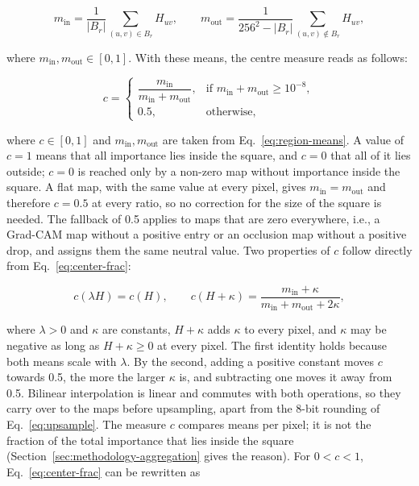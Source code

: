\begin{equation}
m_{\mathrm{in}} = \frac{1}{|B_r|} \sum_{(u,v) \in B_r} H_{uv}, \qquad
m_{\mathrm{out}} = \frac{1}{256^2 - |B_r|} \sum_{(u,v) \notin B_r} H_{uv},
\label{eq:region-means}
\end{equation}

where $m_{\mathrm{in}}, m_{\mathrm{out}} \in [0,1]$. With these means, the centre
measure reads as follows:

\begin{equation}
c =
\begin{cases}
\dfrac{m_{\mathrm{in}}}{m_{\mathrm{in}} + m_{\mathrm{out}}},
& \text{if } m_{\mathrm{in}} + m_{\mathrm{out}} \ge 10^{-8},\\[1.5ex]
0.5, & \text{otherwise,}
\end{cases}
\label{eq:center-frac}
\end{equation}

where $c \in [0,1]$ and $m_{\mathrm{in}}, m_{\mathrm{out}}$ are taken from
Eq.~\eqref{eq:region-means}. A value of $c = 1$ means that all importance lies inside
the square, and $c = 0$ that all of it lies outside; $c = 0$ is reached only by a
non-zero map without importance inside the square. A flat map, with the same value at
every pixel, gives $m_{\mathrm{in}} = m_{\mathrm{out}}$ and therefore $c = 0.5$ at
every ratio, so no correction for the size of the square is needed. The fallback of
0.5 applies to maps that are zero everywhere, i.e., a Grad-CAM map without a positive
entry or an occlusion map without a positive drop, and assigns them the same neutral
value. Two properties of $c$ follow directly from Eq.~\eqref{eq:center-frac}:

\begin{equation}
c(\lambda H) = c(H), \qquad
c(H + \kappa) = \frac{m_{\mathrm{in}} + \kappa}{m_{\mathrm{in}} + m_{\mathrm{out}} +
2\kappa},
\label{eq:c-invariance}
\end{equation}

where $\lambda > 0$ and $\kappa$ are constants, $H + \kappa$ adds $\kappa$ to every
pixel, and $\kappa$ may be negative as long as $H + \kappa \ge 0$ at every pixel. The
first identity holds because both means scale with $\lambda$. By the second, adding a
positive constant moves $c$ towards 0.5, the more the larger $\kappa$ is, and
subtracting one moves it away from 0.5.
Bilinear interpolation is linear and commutes with both operations, so they carry over
to the maps before upsampling, apart from the 8-bit rounding of
Eq.~\eqref{eq:upsample}. The measure $c$ compares means per pixel; it is not the
fraction of the total importance that lies inside the square
(Section~\ref{sec:methodology-aggregation} gives the reason). For $0 < c < 1$,
Eq.~\eqref{eq:center-frac} can be rewritten as

